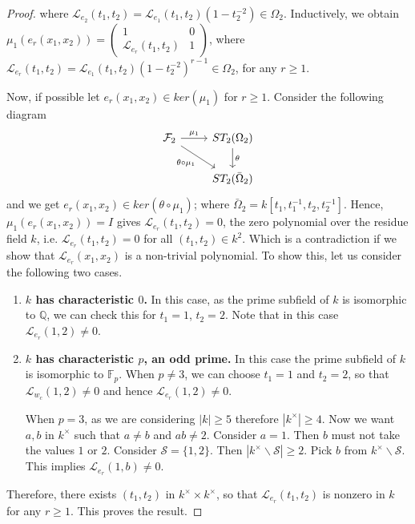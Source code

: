 \documentclass[10pt,twoside]{amsart}
\theoremstyle{definition}
\theoremstyle{definition}
\begin{document}
\begin{proof}
 where $\mathcal{L}_{e_2}(t_1, t_2) = \mathcal{L}_{e_1}(t_1, t_2)(1-t_2^{-2}) \in \Omega_2.$
Inductively, we obtain $\mu_1(e_r(x_1, x_2))=\left(\begin{array}{cc}
   1  & 0 \\  \mathcal{L}_{e_r}(t_1, t_2) & 1
\end{array}\right)$, where $\mathcal{L}_{e_r}(t_1,t_2) = \mathcal{L}_{e_1}(t_1, t_2)(1-t_2^{-2})^{r-1}\in \Omega_2$, for any $r\geq 1$. 

Now, if possible let $e_r(x_1, x_2)\in ker(\mu_1)$ for $r\geq 1$. Consider the following diagram 
$$\begin{tikzcd}
	{\mathcal F_2} & {ST_2(\Omega_2)} \\
	& {ST_2(\bar{\Omega}_2)}
	\arrow["{\mu_1}", from=1-1, to=1-2]
	\arrow["{\theta\circ \mu_1}"', from=1-1, to=2-2]
	\arrow["\theta", from=1-2, to=2-2]
\end{tikzcd}$$ and we get $e_r(x_1, x_2)\in ker(\theta \circ \mu_1)$; where $\bar{\Omega}_2 = k[t_1, t_1^{-1}, t_2, t_2^{-1}]$. Hence, $\mu_1(e_r(x_1, x_2))=I$ gives $\mathcal{L}_{e_r}(t_1, t_2) = 0$, the zero polynomial over the residue field $k$, i.e. $\mathcal{L}_{e_r}(t_1, t_2) = 0$ for all $(t_1, t_2)\in k^2$. Which is a contradiction if we show that $\mathcal L_{e_r}(x_1, x_2)$ is a non-trivial polynomial. To show this, let us consider the following two cases.
\begin{enumerate}
\item \textbf{$k$ has characteristic $0$.} In this case, as the prime subfield of $k$ is isomorphic to $\mathbb{Q}$, we can check this for $t_1 = 1$, $t_2 = 2$. Note that in this case $\mathcal{L}_{e_r}(1, 2)\neq 0$.
\item \textbf{$k$ has characteristic $p$, an odd prime.} In this case the prime subfield of $k$ is isomorphic to $\mathbb{F}_p$. When $p\neq 3$, we can choose $t_1 = 1$ and $t_2 = 2$, so that $\mathcal{L}_{w_c}(1, 2)\neq 0$ and hence $\mathcal{L}_{e_r}(1,2)\neq 0$. 
    
When $p=3$, as we are considering $|k| \geq 5$ therefore $|k^{\times}| \geq 4$. Now we want $a, b$ in $k^{\times}$ such that $a\neq b$ and $ab\neq 2$. Consider $a=1$. Then $b$ must not take the values $ 1$ or $ 2$. Consider $\mathcal{S}=\{1, 2\}$. Then $|k^{\times}\backslash \mathcal{S}| \geq 2$. Pick $b$ from $k^{\times}\backslash \mathcal{S}$. This implies $\mathcal{L}_{e_r}(1, b)\neq 0$.
\end{enumerate}
Therefore, there exists $(t_1, t_2)$ in $k^{\times}\times k^{\times}$, so that $\mathcal{L}_{e_r}(t_1, t_2)$ is nonzero in $k$ for any $r\geq 1$. This proves the result.
\end{proof}
\end{document}
